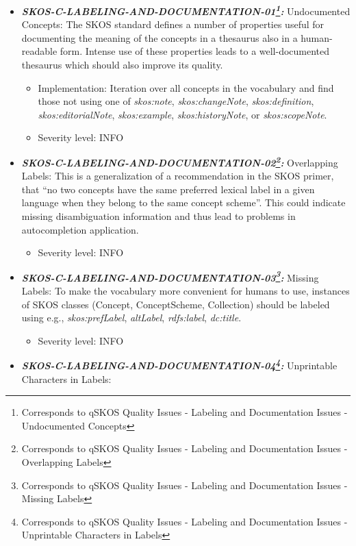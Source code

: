 \documentclass{llncs}
\begin{document}
\begin{itemize}
	\item \textbf{{\em SKOS-C-LABELING-AND-DOCUMENTATION-01\footnote{Corresponds to qSKOS Quality Issues - Labeling and Documentation Issues - Undocumented Concepts}:}}
	Undocumented Concepts:
  The SKOS standard defines a number of properties useful for documenting the meaning of the concepts in a thesaurus also in a human-readable form. Intense use of these properties leads to a well-documented thesaurus which should also improve its quality.  
	\begin{itemize}
	  \item Implementation:
		Iteration over all concepts in the vocabulary and find those not using one of \emph{skos:note}, \emph{skos:changeNote}, \emph{skos:definition}, \emph{skos:editorialNote}, \emph{skos:example}, \emph{skos:historyNote}, or \emph{skos:scopeNote}.
		\item Severity level: INFO
	\end{itemize}
	\item \textbf{{\em SKOS-C-LABELING-AND-DOCUMENTATION-02\footnote{Corresponds to qSKOS Quality Issues - Labeling and Documentation Issues - Overlapping Labels}:}}
	Overlapping Labels:
	This is a generalization of a recommendation in the SKOS primer, that “no two concepts have the same preferred lexical label in a given language when they belong to the same concept scheme”. This could indicate missing disambiguation information and thus lead to problems in autocompletion application. 
	\begin{itemize}
		\item Severity level: INFO
	\end{itemize}
	\item \textbf{{\em SKOS-C-LABELING-AND-DOCUMENTATION-03\footnote{Corresponds to qSKOS Quality Issues - Labeling and Documentation Issues - Missing Labels}:}}
	Missing Labels:
	To make the vocabulary more convenient for humans to use, instances of SKOS classes (Concept, ConceptScheme, Collection) should be labeled using e.g., \emph{skos:prefLabel}, \emph{altLabel}, \emph{rdfs:label}, \emph{dc:title}. 
	\begin{itemize}
		\item Severity level: INFO
	\end{itemize}
	\item \textbf{{\em SKOS-C-LABELING-AND-DOCUMENTATION-04\footnote{Corresponds to qSKOS Quality Issues - Labeling and Documentation Issues - Unprintable Characters in Labels}:}}
	Unprintable Characters in Labels:

\end{itemize}
\end{document}
